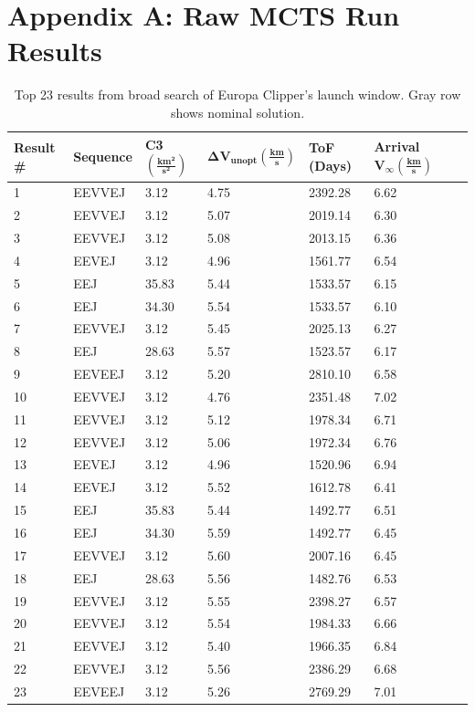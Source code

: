 \documentclass[letterpaper, preprint, paper,11pt]{AAS}	%
\begin{document}
\appendix
\newpage\section{Appendix A: Raw MCTS Run Results}
\begin{table}[h!]
    \centering
    \caption{Top 23 results from broad search of Europa Clipper's launch window. Gray row shows nominal solution.}
    \begin{tabular}{lllllll}
        \toprule
        \textbf{Result \#} & \textbf{Sequence}   & \textbf{C3} $\boldsymbol{(\frac{km^2}{s^2})}$    & $\boldsymbol{\Delta V_{unopt} (\frac{km}{s})}$  & \textbf{ToF (Days) }           & \textbf{Arrival} $\boldsymbol{V_\infty (\frac{km}{s})}$          \\
        \midrule
        1  & EEVVEJ & 3.12  & 4.75 & 2392.28 & 6.62  \\
        2  & EEVVEJ & 3.12  & 5.07 & 2019.14 & 6.30  \\
        3  & EEVVEJ & 3.12  & 5.08 & 2013.15 & 6.36  \\
        4  & EEVEJ  & 3.12  & 4.96 & 1561.77 & 6.54  \\
        5  & EEJ    & 35.83 & 5.44 & 1533.57 & 6.15  \\
        6  & EEJ    & 34.30 & 5.54 & 1533.57 & 6.10  \\
        7  & EEVVEJ & 3.12  & 5.45 & 2025.13 & 6.27  \\
        8  & EEJ    & 28.63 & 5.57 & 1523.57 & 6.17  \\
        \rowcolor{lightgray}9  & EEVEEJ & 3.12  & 5.20 & 2810.10 & 6.58  \\
        10  & EEVVEJ & 3.12  & 4.76 & 2351.48 & 7.02  \\
        11 & EEVVEJ & 3.12  & 5.12 & 1978.34 & 6.71  \\
        12 & EEVVEJ & 3.12  & 5.06 & 1972.34 & 6.76  \\
        13 & EEVEJ  & 3.12  & 4.96 & 1520.96 & 6.94  \\
        14 & EEVEJ  & 3.12  & 5.52 & 1612.78 & 6.41  \\
        15 & EEJ    & 35.83 & 5.44 & 1492.77 & 6.51  \\
        16 & EEJ    & 34.30 & 5.59 & 1492.77 & 6.45  \\
        17 & EEVVEJ & 3.12  & 5.60 & 2007.16 & 6.45  \\
        18 & EEJ    & 28.63 & 5.56 & 1482.76 & 6.53  \\
        19 & EEVVEJ & 3.12  & 5.55 & 2398.27 & 6.57  \\
        20 & EEVVEJ & 3.12  & 5.54 & 1984.33 & 6.66  \\
        21 & EEVVEJ & 3.12  & 5.40 & 1966.35 & 6.84  \\
        22 & EEVVEJ & 3.12  & 5.56 & 2386.29 & 6.68  \\
        23 & EEVEEJ & 3.12  & 5.26 & 2769.29 & 7.01  \\
        \bottomrule
    \end{tabular}
\end{table}
\end{document}
